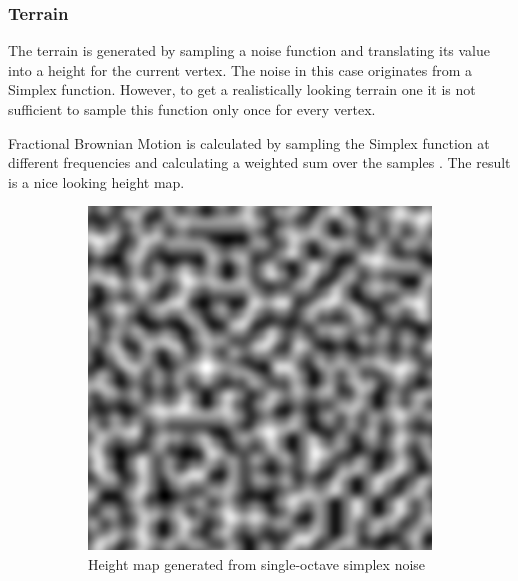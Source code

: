 \newpage
\subsubsection{Terrain}
The terrain is generated by sampling a noise function and translating its value into a height for the current vertex. The noise in this case originates from a Simplex function. However, to get a realistically looking terrain one it is not sufficient to sample this function only once for every vertex.

Fractional Brownian Motion is calculated by sampling the Simplex function at different frequencies and calculating a weighted sum over the samples \cite{FracBrownMotion}.  The result is a nice looking height map. 

\begin{figure}[H]
\begin{subfigure}{.5\textwidth}
  \centering
  \includegraphics[width=0.9\linewidth]{images/Simplex.png}
  \caption{Height map generated from single-octave simplex noise}
  \label{fig:sub1}
\end{subfigure}%
\begin{subfigure}{.5\textwidth}
  \centering

\end{subfigure}
\end{figure}
